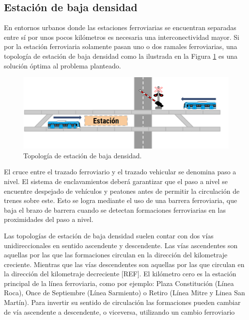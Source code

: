 \subsection{Estación de baja densidad}


En entornos urbanos donde las estaciones ferroviarias se encuentran separadas entre sí por unos pocos kilómetros es necesaria una interconectividad mayor. Si por la estación ferroviaria solamente pasan uno o dos ramales ferroviarias, una topología de estación de baja densidad como la ilustrada en la Figura \ref{fig:simple_1} es una solución óptima al problema planteado.

    \begin{figure}[h]
        \centering
        \includegraphics[width=1\textwidth]{Figuras/simple}
        \centering\caption{Topología de estación de baja densidad.}
        \label{fig:simple_1}
    \end{figure}

El cruce entre el trazado ferroviario y el trazado vehicular se denomina paso a nivel. El sistema de enclavamientos deberá garantizar que el paso a nivel se encuentre despejado de vehículos y peatones antes de permitir la circulación de trenes sobre este. Esto se logra mediante el uso de una barrera ferroviaria, que baja el brazo de barrera cuando se detectan formaciones ferroviarias en las proximidades del paso a nivel.

Las topologías de estación de baja densidad suelen contar con dos vías unidireccionales en sentido ascendente y descendente. 
Las vías ascendentes son aquellas por las que las formaciones circulan en la dirección del kilometraje creciente. Mientras que las vías descendentes son aquellas por las que circulan en la dirección del kilometraje decreciente [REF]. El kilómetro cero es la estación principal de la línea ferroviaria, como por ejemplo: Plaza Constitución (Línea Roca), Once de Septiembre (Línea Sarmiento) o Retiro (Línea Mitre y Linea San Martín). Para invertir su sentido de circulación las formaciones pueden cambiar de vía
ascendente a descendente, o viceversa, utilizando un cambio ferroviario